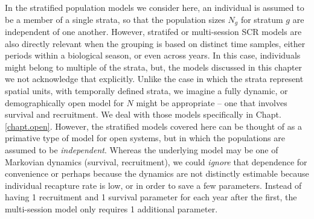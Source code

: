 In the stratified population models we consider here, an individual is assumed
to be a member of a single strata, so that the population sizes
$N_{g}$ for stratum $g$ are independent of one another. However, 
stratifed or multi-session SCR models are also directly relevant when
the grouping is based on distinct time samples, either periods within
a biological season, or even across years. In this case, individuals
might belong to multiple of the strata, but, the models discussed
in this chapter  we  not acknowledge that explicitly.
Unlike the case in which the strata represent spatial units, with
temporally defined strata, we imagine a fully dynamic, or
demographically open model for $N$ might be appropriate -- one that
involves survival and recruitment. We deal with those models
specifically in Chapt. \ref{chapt.open}.  However, the stratified
models covered here can be thought of as a primative type of model for
open systems, but in which the populations are assumed to be {\it
  independent}. Whereas the underlying model may be one of Markovian
dynamics (survival, recruitment), we could {\it ignore} that
dependence for convenience or perhaps because the dynamics are not
distinctly estimable because individual recapture rate is low, or in
order to save a few parameters. Instead of having 1 recruitment and 1
survival parameter for each year after the first, the multi-session
model only requires 1 additional parameter.

